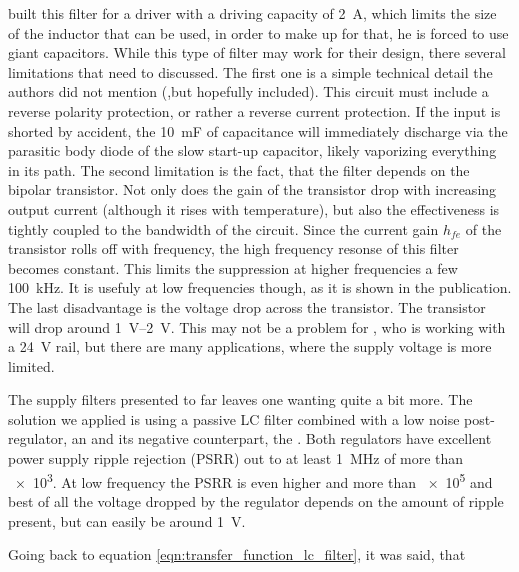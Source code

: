 \citeauthor{laser_driver_qcl_taubman} built this filter for a driver with a driving capacity of \qty{2}{\A}, which limits the size of the inductor that can be used, in order to make up for that, he is forced to use giant capacitors. While this type of filter may work for their design, there several limitations that need to discussed. The first one is a simple technical detail the authors did not mention (,but hopefully included). This circuit must include a reverse polarity protection, or rather a reverse current protection. If the input is shorted by accident, the \qty{10}{\milli\farad} of capacitance will immediately discharge via the parasitic body diode of the slow start-up capacitor, likely vaporizing everything in its path. The second limitation is the fact, that the filter depends on the bipolar transistor. Not only does the gain of the transistor drop with increasing output current (although it rises with temperature), but also the effectiveness is tightly coupled to the bandwidth of the circuit. Since the current gain $h_{fe}$ of the transistor rolls off with frequency, the high frequency resonse of this filter becomes constant. This limits the suppression at higher frequencies a few \qty{100}{\kHz}. It is usefuly at low frequencies though, as it is shown in the publication. The last disadvantage is the voltage drop across the transistor. The transistor will drop around \qtyrange[range-units = single]{1}{2}{\V}. This may not be a problem for \citeauthor{laser_driver_qcl_taubman}, who is working with a \qty{24}{\V} rail, but there are many applications, where the supply voltage is more limited.

The supply filters presented to far leaves one wanting quite a bit more. The solution we applied is using a passive LC filter combined with a low noise post-regulator, an  and its negative counterpart, the . Both regulators have excellent power supply ripple rejection (PSRR) out to at least \qty{1}{\MHz} of more than \num{e3}. At low frequency the PSRR is even higher and more than \num{e5} and best of all the voltage dropped by the regulator depends on the amount of ripple present, but can easily be around \qty{1}{\V}.

Going back to equation \ref{eqn:transfer_function_lc_filter}, it was said, that

\clearpage
